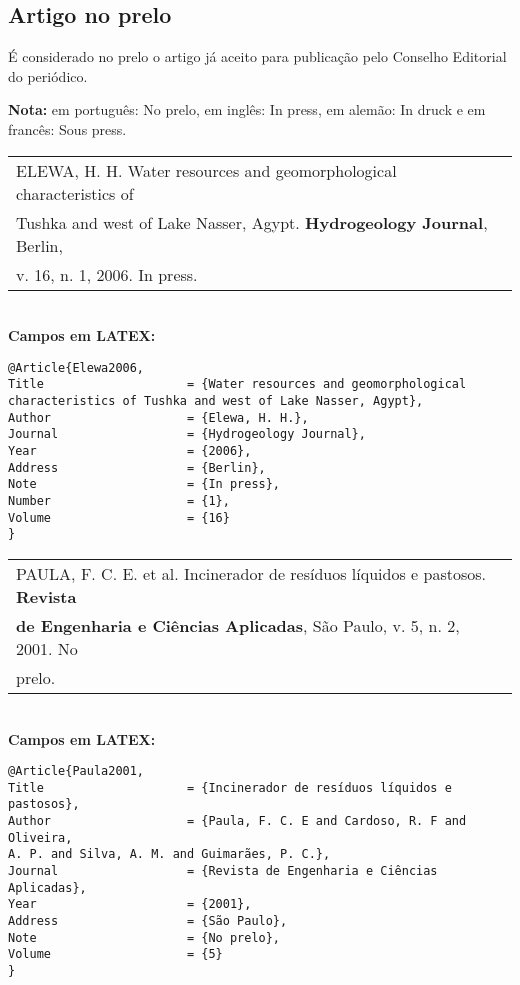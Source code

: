 \subsection{Artigo no prelo}

É considerado no prelo o artigo já aceito para publicação pelo Conselho
Editorial do periódico.

\textbf{Nota:} em português: No prelo, em inglês: In press, em alemão: In druck
e em francês: Sous press. 

\begin{tabular}{|l|c|} \hline
ELEWA, H. H. Water resources and geomorphological characteristics of
\\Tushka and west of Lake Nasser, Agypt. \textbf{Hydrogeology Journal}, Berlin,
\\v. 16, n. 1, 2006. In press. \\\hline
\end{tabular} \\

\textbf{Campos em LATEX:} 

\begingroup
\fontsize{10pt}{12pt}\selectfont
\begin{verbatim}
@Article{Elewa2006,
Title                    = {Water resources and geomorphological 
characteristics of Tushka and west of Lake Nasser, Agypt},
Author                   = {Elewa, H. H.},
Journal                  = {Hydrogeology Journal},
Year                     = {2006},
Address                  = {Berlin},
Note                     = {In press},
Number                   = {1},
Volume                   = {16}
}
\end{verbatim}
\endgroup
	
\begin{tabular}{|l|c|} \hline
	PAULA, F. C. E. et al. Incinerador de resíduos líquidos e pastosos. 
	\textbf{Revista}                                                      \\ \textbf{ de Engenharia e Ciências Aplicadas}, São Paulo, v. 5, n. 2,
	2001. No                                                              \\prelo. \\\hline
\end{tabular} \\
	
\textbf{Campos em LATEX:} 
	
\begingroup
\fontsize{10pt}{12pt}\selectfont
\begin{verbatim}
@Article{Paula2001,
Title                    = {Incinerador de resíduos líquidos e pastosos},
Author                   = {Paula, F. C. E and Cardoso, R. F and Oliveira, 
A. P. and Silva, A. M. and Guimarães, P. C.},
Journal                  = {Revista de Engenharia e Ciências Aplicadas},
Year                     = {2001},
Address                  = {São Paulo},
Note                     = {No prelo},
Volume                   = {5}
}
\end{verbatim}
\endgroup
	
